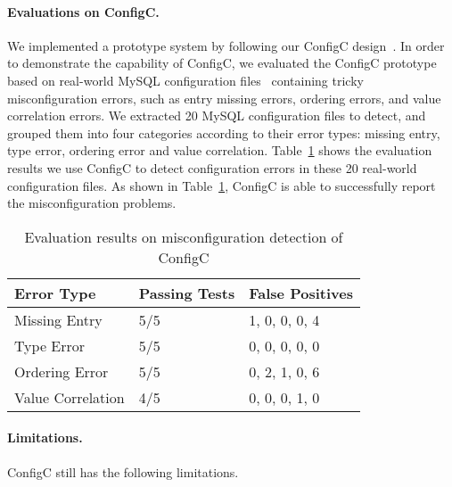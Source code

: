 \paragraph{Evaluations on ConfigC.}
We implemented a prototype system by following 
our ConfigC design~\cite{santolucitoCAV}.
In order to demonstrate the capability of ConfigC,
we evaluated the ConfigC prototype based on real-world
MySQL configuration files~\cite{configdataset} 
containing tricky misconfiguration errors,
such as entry missing errors, ordering errors, and
value correlation errors.
We extracted 20 MySQL configuration files to detect, 
and grouped them into four categories according to their
error types: missing entry, type error, ordering error
and value correlation.
Table~\ref{table:res} shows the evaluation results we use
ConfigC to detect configuration errors in these 20 real-world
configuration files.
As shown in Table~\ref{table:res},
ConfigC is able to successfully report the misconfiguration problems.

\begin{table}[h]
\centering
\caption{Evaluation results on misconfiguration detection of ConfigC}
\label{table:res}
\begin{tabular}{|l|l|l|}
\hline
Error Type       & Passing Tests & False Positives  \\ 
\hline
\hline
Missing Entry      & 5/5           & 1, 0, 0, 0, 4        \\ \hline
Type Error         & 5/5           & 0, 0, 0, 0, 0          \\ \hline
Ordering Error     & 5/5           & 0, 2, 1, 0, 6       \\ \hline
Value Correlation  & 4/5           & 0, 0, 0, 1, 0        \\ 
\hline
\end{tabular}
\end{table}

\paragraph{Limitations.}
ConfigC still has the following limitations.

